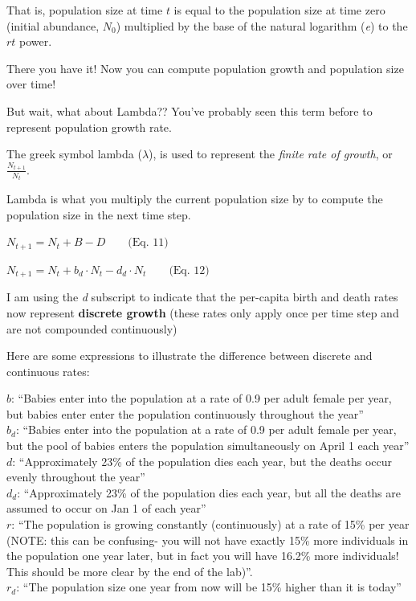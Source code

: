 \documentclass[
]{article}
\begin{document}
That is, population size at time \(t\) is equal to the population size
at time zero (initial abundance, \(N_0\)) multiplied by the base of the
natural logarithm (\emph{e}) to the \(rt\) power.

There you have it! Now you can compute population growth and population
size over time!

But wait, what about Lambda?? You've probably seen this term before to
represent population growth rate.

The greek symbol lambda (\(\lambda\)), is used to represent the
\emph{finite rate of growth}, or \(\frac {N_{t+1}}{N_t}\).

Lambda is what you multiply the current population size by to compute
the population size in the next time step.

\(N_{t+1}=N_t + B - D \qquad \text{(Eq. 11)}\)

\(N_{t+1}=N_t + b_d \cdot N_t - d_d \cdot N_t \qquad \text{(Eq. 12)}\)

I am using the \emph{d} subscript to indicate that the per-capita birth
and death rates now represent \textbf{discrete growth} (these rates only
apply once per time step and are not compounded continuously)

Here are some expressions to illustrate the difference between discrete
and continuous rates:

\(b\): ``Babies enter into the population at a rate of 0.9 per adult
female per year, but babies enter enter the population continuously
throughout the year''\\
\(b_d\): ``Babies enter into the population at a rate of 0.9 per adult
female per year, but the pool of babies enters the population
simultaneously on April 1 each year''\\
\(d\): ``Approximately 23\% of the population dies each year, but the
deaths occur evenly throughout the year''\\
\(d_d\): ``Approximately 23\% of the population dies each year, but all
the deaths are assumed to occur on Jan 1 of each year''\\
\(r\): ``The population is growing constantly (continuously) at a rate
of 15\% per year (NOTE: this can be confusing- you will not have exactly
15\% more individuals in the population one year later, but in fact you
will have 16.2\% more individuals! This should be more clear by the end
of the lab)''.\\
\(r_d\): ``The population size one year from now will be 15\% higher
than it is today''
\end{document}
